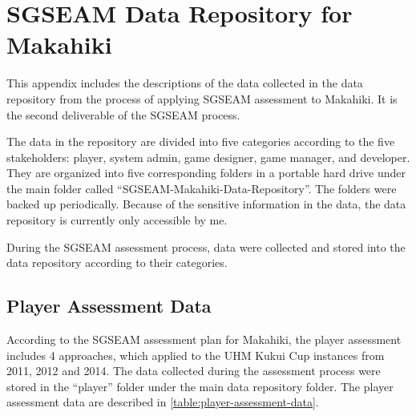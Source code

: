 \chapter{SGSEAM Data Repository for Makahiki}
\label{app:makahiki-data-repository}

This appendix includes the descriptions of the data collected in the data repository from the process of applying SGSEAM assessment to Makahiki. It is the second deliverable of the SGSEAM process. 

The data in the repository are divided into five categories according to the five stakeholders: player, system admin, game designer, game manager, and developer. They are organized into five corresponding folders in a portable hard drive under the main folder called ``SGSEAM-Makahiki-Data-Repository''. The folders were backed up periodically. Because of the sensitive information in the data, the data repository is currently only accessible by me. 

During the SGSEAM assessment process, data were collected and stored into the data repository according to their categories.

\section{Player Assessment Data}

According to the SGSEAM assessment plan for Makahiki, the player assessment includes 4 approaches, which applied to the UHM Kukui Cup instances from 2011, 2012 and 2014. The data collected during the assessment process were stored in the ``player'' folder under the main data repository folder. The player assessment data are described in \autoref{table:player-assessment-data}.

